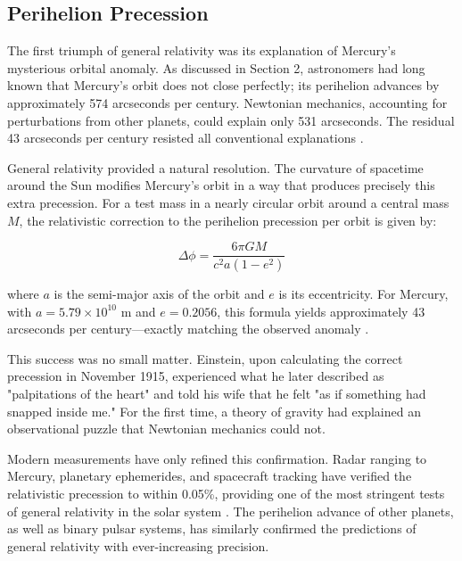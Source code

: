 \documentclass[12pt, a4paper]{article}
\begin{document}
	\subsection{Perihelion Precession}
	The first triumph of general relativity was its explanation of Mercury's mysterious orbital anomaly. As discussed in Section 2, astronomers had long known that Mercury's orbit does not close perfectly; its perihelion advances by approximately 574 arcseconds per century. Newtonian mechanics, accounting for perturbations from other planets, could explain only 531 arcseconds. The residual 43 arcseconds per century resisted all conventional explanations \citep{willConfrontationGeneralRelativity2014}.
	
	General relativity provided a natural resolution. The curvature of spacetime around the Sun modifies Mercury's orbit in a way that produces precisely this extra precession. For a test mass in a nearly circular orbit around a central mass \(M\), the relativistic correction to the perihelion precession per orbit is given by:
	
	\begin{equation}
		\Delta\phi = \frac{6\pi G M}{c^2 a(1-e^2)}
	\end{equation}
	
	where \(a\) is the semi-major axis of the orbit and \(e\) is its eccentricity. For Mercury, with \(a = 5.79 \times 10^{10}\text{ m}\) and \(e = 0.2056\), this formula yields approximately 43 arcseconds per century—exactly matching the observed anomaly \citep{carrollSpacetimeGeometryIntroduction2019}.
	
	This success was no small matter. Einstein, upon calculating the correct precession in November 1915, experienced what he later described as "palpitations of the heart" and told his wife that he felt "as if something had snapped inside me." For the first time, a theory of gravity had explained an observational puzzle that Newtonian mechanics could not.
	
	Modern measurements have only refined this confirmation. Radar ranging to Mercury, planetary ephemerides, and spacecraft tracking have verified the relativistic precession to within 0.05\%, providing one of the most stringent tests of general relativity in the solar system \citep{willConfrontationGeneralRelativity2014}. The perihelion advance of other planets, as well as binary pulsar systems, has similarly confirmed the predictions of general relativity with ever-increasing precision.
	
\end{document}
